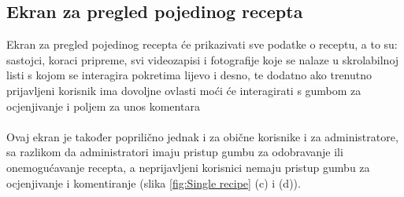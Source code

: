 \documentclass[times, utf8, zavrsni]{fer}
\begin{document}
\subsection{Ekran za pregled pojedinog recepta}
Ekran za pregled pojedinog recepta će prikazivati sve podatke o receptu, a to su:
sastojci, koraci pripreme, svi videozapisi i fotografije
koje se nalaze u skrolabilnoj listi s kojom se interagira pokretima lijevo i desno, te dodatno ako
trenutno prijavljeni korisnik ima dovoljne ovlasti moći će interagirati s gumbom za ocjenjivanje i
poljem za unos komentara
\\\\
Ovaj ekran je također poprilično jednak i za obične korisnike i za administratore,
sa razlikom da administratori imaju pristup gumbu za odobravanje ili onemogućavanje recepta, a neprijavljeni
korisnici nemaju pristup gumbu za ocjenjivanje i komentiranje (slika \ref{fig:Single recipe} (c) i (d)).
\end{document}
